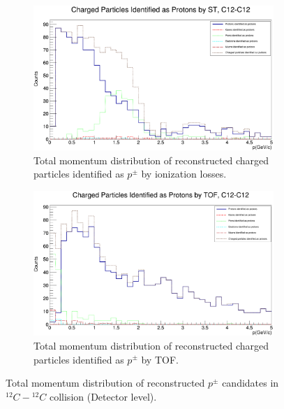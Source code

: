 \documentclass[12pt]{article}
\begin{document}
\begin{figure}[h]
\vspace{1cm}
\centering
\begin{subfigure}[h]{0.49\textwidth}
	\centering
	\includegraphics[scale=0.14]{Detector_pToT_protons(st)_C12.png}
	\caption{Total momentum distribution of reconstructed charged particles identified as $p^{\pm}$ by ionization losses.}
	\label{sim-p-protons-dedx}
\end{subfigure}
\hfill
\begin{subfigure}[h]{0.49\textwidth}
\centering
\includegraphics[scale=0.14]{Detector_pToT_protons(tof)_C12.png}
\caption{Total momentum distribution of reconstructed charged particles identified as $p^{\pm}$ by TOF.}
\label{sim-p-protons-tof}
\end{subfigure}
\caption{Total momentum distribution of reconstructed $p^\pm$ candidates in $^{12}C-{^{12}C}$ collision (Detector level).}
\label{sim-p-protons}
\end{figure}
\end{document}
